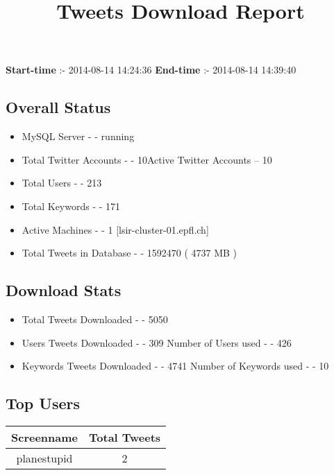 \documentclass{article}\usepackage[T1]{fontenc}
\begin{document}
\title{\textbf{Tweets Download Report}}
               \date{}
                \maketitle
               \centerline{\textbf{Start-time} :- 2014-08-14 14:24:36 \hspace{40pt} \textbf{End-time} :- 2014-08-14 14:39:40}               \subsection*{Overall Status}                \begin{itemize}                \item MySQL Server - - running               \item Total Twitter Accounts - - 10\newline Active Twitter Accounts -- 10               \item Total Users - - 213               \item Total Keywords - - 171               \item Active Machines - - 1 [lsir-cluster-01.epfl.ch]               \item Total Tweets in Database - - 1592470 ( 4737 MB )               \end{itemize}               \subsection*{Download Stats}                \begin{itemize}                \item Total Tweets Downloaded - - 5050               \item Users Tweets Downloaded - - 309 \newline Number of Users used - - 426               \item Keywords Tweets Downloaded - - 4741 \newline Number of Keywords used - - 10              \end{itemize}              \subsection*{Top Users}\begin{tabular}{|c|c|}         \hline         Screenname & Total Tweets \\ 
 \hline
planestupid & 2\\ 
 \hline

\end{tabular}
\end{document}
